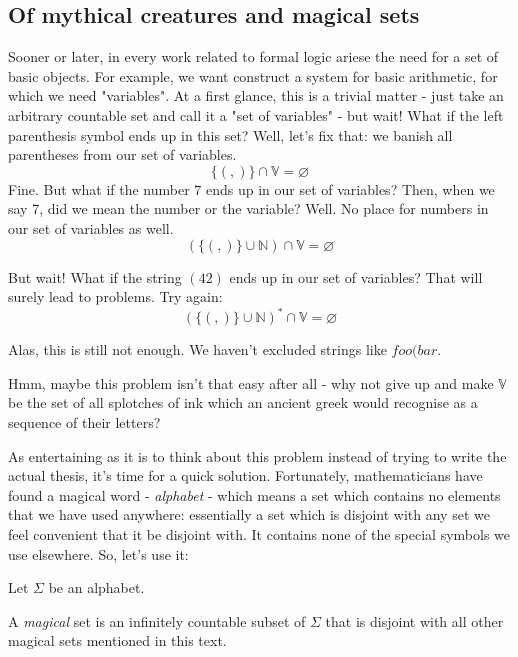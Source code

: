 \documentclass[main.tex]{subfiles}
\begin{document}
\subsection{Of mythical creatures and magical sets}

Sooner or later, in every work related to formal logic ariese the need for
a set of basic objects. For example, we want construct a system for basic
arithmetic, for which we need "variables".
At a first glance, this is a trivial matter - just take an arbitrary countable
set and call it a "set of variables" - but wait! What if the left parenthesis
symbol ends up in this set? Well, let's fix that: we banish all parentheses
from our set of variables.
\[ \{ (, ) \} \cap \mathbb{V} = \varnothing \]
Fine. But what if the number $7$ ends up in our set of variables? Then,
when we say 7, did we mean the number or the variable? Well. No place for
numbers in our set of variables as well.
\[ ( \{ (, ) \} \cup \mathbb{N} ) \cap \mathbb{V} = \varnothing \]

But wait! What if the string $(42)$ ends up in our set of variables? That will
surely lead to problems. Try again:
\[ ( \{ (, ) \} \cup \mathbb{N} )^* \cap \mathbb{V} = \varnothing \]

Alas, this is still not enough. We haven't excluded strings like $foo(bar$.

Hmm, maybe this problem isn't that easy after all - why not give up and make
$\mathbb{V}$ be the set of all splotches of ink which an ancient greek would
recognise as a sequence of their letters?

As entertaining as it is to think about this problem instead of trying to write
the actual thesis, it's time for a quick solution. Fortunately, mathematicians
have found a magical word - \emph{alphabet} - which means a set which contains
no elements that we have used anywhere: essentially a set which is disjoint
with any set we feel convenient that it be disjoint with. It contains none of
the special symbols we use elsewhere. So, let's use it:

Let $\Sigma$ be an alphabet.
\begin{defn}
    A \emph{magical} set is an infinitely countable subset of $\Sigma$
    that is disjoint with all other magical sets mentioned in this text.
\end{defn}
\end{document}
